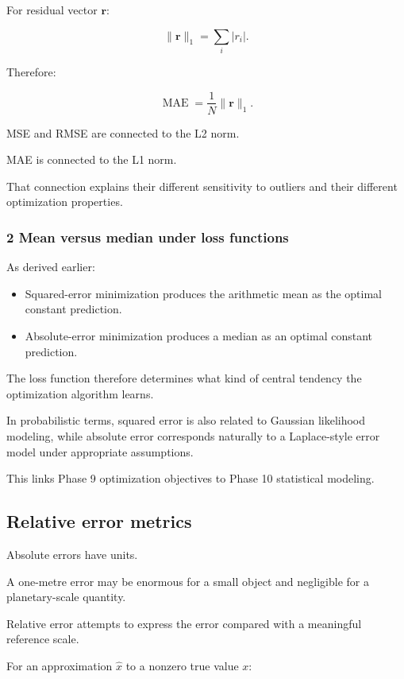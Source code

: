 For residual vector \(\mathbf r\):

\[
 \|\mathbf r\|_1=\sum_i|r_i|.
\]

Therefore:

\[
 \boxed{ \operatorname{MAE}= \frac1N\|\mathbf r\|_1 }.
\]

MSE and RMSE are connected to the L2 norm.

MAE is connected to the L1 norm.

That connection explains their different sensitivity to outliers and their different optimization properties.

\subsubsection{2 Mean versus median under loss functions}\label{02-foundations-ii-ch030-mean-versus-median-under-loss-functions}

As derived earlier:

\begin{itemize}
\tightlist
\item
  Squared-error minimization produces the arithmetic mean as the optimal constant prediction.
\item
  Absolute-error minimization produces a median as an optimal constant prediction.
\end{itemize}

The loss function therefore determines what kind of central tendency the optimization algorithm learns.

In probabilistic terms, squared error is also related to Gaussian likelihood modeling, while absolute error corresponds naturally to a Laplace-style error model under appropriate assumptions.

This links Phase 9 optimization objectives to Phase 10 statistical modeling.

\subsection{Relative error metrics}\label{02-foundations-ii-ch030-relative-error-metrics}

Absolute errors have units.

A one-metre error may be enormous for a small object and negligible for a planetary-scale quantity.

Relative error attempts to express the error compared with a meaningful reference scale.

For an approximation \(\hat x\) to a nonzero true value \(x\):

